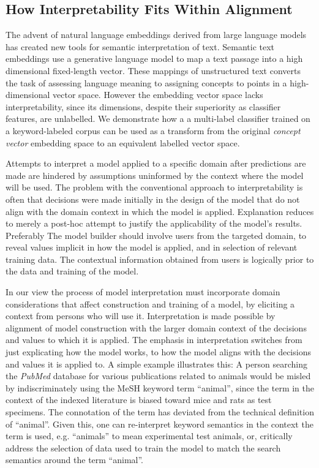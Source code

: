 \subsection{How Interpretability Fits Within Alignment}

The advent of natural language embeddings derived from large language models has created new tools for semantic interpretation of text. Semantic text embeddings use a generative language model to map a text passage into a high dimensional fixed-length vector. These mappings of unstructured text converts the task of assessing language meaning to assigning concepts to points in a high-dimensional vector space. However the embedding vector space lacks interpretability, since its dimensions, despite their superiority as classifier features, are unlabelled. We demonstrate how a a multi-label classifier trained on a keyword-labeled corpus can be used as a transform from the original {\em concept vector} embedding space to an equivalent labelled vector space.  

Attempts to interpret a model applied to a specific domain after predictions are made are hindered by assumptions uninformed by the context where the model will be used.   The problem with the conventional approach to interpretability is often that decisions were made initially in the design of the model that do not align with the domain context in which the model is applied. Explanation reduces to merely a post-hoc attempt to justify the applicability of the model's results. Preferably The model builder should involve users from the targeted domain, to reveal values implicit in how the model is applied, and in selection of relevant training data. The contextual information obtained from users is logically prior to the data and training of the model. 


In our view the process of model interpretation must incorporate domain considerations that affect construction and training of a model, by eliciting a context from persons who will use it. Interpretation is made possible by alignment of model construction with the larger domain context of the decisions and values to which it is applied. The emphasis in interpretation switches from just explicating how the model works, to how the model aligns with the decisions and values it is applied to.  A simple example illustrates this: A person searching the {\em PubMed} database for various publications related to animals would be misled by indiscriminately using the MeSH keyword term ``animal'', since the term in the context of the indexed literature is biased toward mice and rats as test specimens. The connotation of the term has deviated from the technical definition of ``animal''.  Given this, one can re-interpret keyword semantics in the context the term is used, e.g. ``animals'' to mean experimental test animals, or, critically address the selection of data used to train the model to match the search semantics around the term ``animal''.

